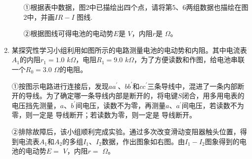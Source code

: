 \begin{enumerate}[leftmargin=0em]
\begin{enumerate}
①根据表中数据，图$ 2 $中已描绘出四个点，请将第$ 5 $、$ 6 $两组数据也描绘在图$ 2 $中，并画$ IR-I $ 图线.

②根据图线可得电池的电动势$ E $是  
$ V $，内阻$ r $是  
$ \Omega $。




\end{enumerate}



\newpage

\item 
{}
某探究性学习小组利用如图所示的电路测量电池的电动势和内阻。其中电流表$ A_{1} $的内阻$ r_{1} =1.0 $ $ k \Omega $，电阻$ R_{1} =9.0 $ $ k \Omega $，为了方便读数和作图，给电池串联一个$ R_{0} =3.0 $ $ \Omega $的电阻。
\begin{figure}[h!]
\centering
 \qquad 
 
\end{figure}


①按图示电路进行连接后，发现$ aa ^{\prime} $、$ bb ^{\prime} $和$ cc ^{\prime} $三条导线中，混进了一条内部断开的导线。为了确定哪一条导线内部是断开的，将电键$ S $闭合，用多用电表的电压挡先测量，$ a $、$ b ^{\prime} $间电压，读数不为零，再测量$ a $、$ a ^{\prime} $间电压，若读数不为零，则一定是  
导线断开；若读数为零，则一定是  
导线断开。

②排除故障后，该小组顺利完成实验。通过多次改变滑动变阻器触头位置，得到电流表$ A_{1} $和$ A_{2} $的多组$ I_{1} $、$ I_{2} $数据，作出图象如右图。由$ I_{1} - I_{2} $图象得到的电池的电动势$ E=$  
$V $，内阻$ r= $  
$ \Omega $。








\end{enumerate}

